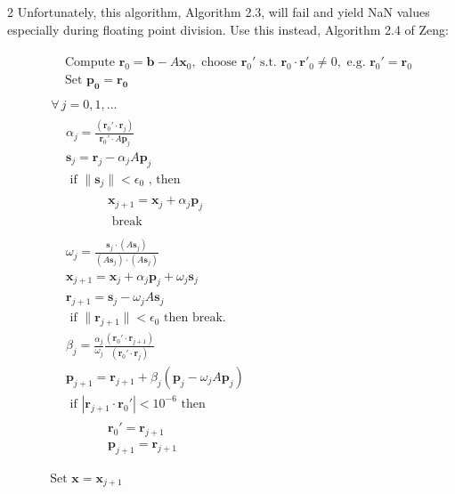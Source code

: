 \documentclass[10pt]{amsart}
\begin{document}
\begin{multicols*}{2}
Unfortunately, this algorithm, Algorithm 2.3, will fail and yield NaN values especially during floating point division. Use this instead, Algorithm 2.4 of Zeng:

\begin{equation}
	\begin{gathered}
		\begin{aligned}
			& \text{ Compute } \mathbf{r}_0 = \mathbf{b} - A \mathbf{x}_0, \text{ choose } \mathbf{r}_0' \text{ s.t. } \mathbf{r}_0 \cdot \mathbf{r}'_0 \neq 0, \text{ e.g. } \mathbf{r}_0' = \mathbf{r}_0 \\
			& \text{ Set } \mathbf{p_0} = \mathbf{r_0}
		\end{aligned} \\
		\begin{gathered}
			\forall \, j = 0, 1, \dots \\
			\begin{aligned}
				& \alpha_j = \frac{ (\mathbf{r}_0' \cdot \mathbf{r}_j) }{ \mathbf{r}_0' \cdot A \mathbf{p}_j } \\
				& \mathbf{s}_j = \mathbf{r}_j - \alpha_j A \mathbf{p}_j \\
				& \text{ if } \| \mathbf{s}_j \| < \epsilon_0 \text{ , then } \\
				& \quad \quad \, \begin{aligned}
					& \mathbf{x}_{j+1} = \mathbf{x}_j + \alpha_j \mathbf{p}_j \\
					& \text{ break } \\
				\end{aligned}  \\
				& \omega_j = \frac{ \mathbf{s}_j \cdot (A \mathbf{s}_j) }{ (A\mathbf{s}_j)\cdot (A\mathbf{s}_j) } \\
				& \mathbf{x}_{j+1} = \mathbf{x}_j + \alpha_j \mathbf{p}_j + \omega_j \mathbf{s}_j \\
				& \mathbf{r}_{j+1} = \mathbf{s}_j - \omega_j A\mathbf{s}_j \\
				& \text{ if } \| \mathbf{r}_{j+1} \| < \epsilon_0 \text{ then break. } \\
				& \beta_j = \frac{ \alpha_j }{ \omega_j } \frac{ (\mathbf{r}_0' \cdot \mathbf{r}_{j+1} ) }{ (\mathbf{r}_0' \cdot \mathbf{r}_j )} \\
				& \mathbf{p}_{j+1} = \mathbf{r}_{j+1} + \beta_j (\mathbf{p}_j - \omega_j A \mathbf{p}_j) \\
				& \text{ if } | \mathbf{r}_{j+1} \cdot \mathbf{r}_0' | < 10^{-6} \text{ then } \\
				& \quad \quad \, \begin{aligned}
					& \mathbf{r}_0' = \mathbf{r}_{j+1} \\
					& \mathbf{p}_{j+1} = \mathbf{r}_{j+1}
				\end{aligned} \\
			\end{aligned} 
		\end{gathered}	\\
		\text{ Set } \mathbf{x} = \mathbf{x}_{j+1}
	\end{gathered}
\end{equation}


\end{multicols*}
\end{document}
